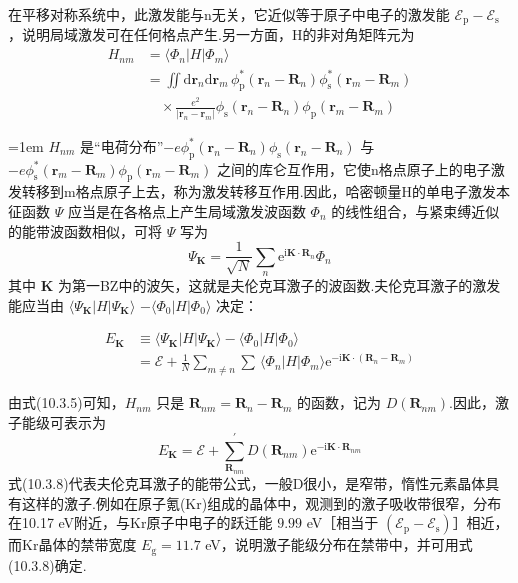 在平移对称系统中，此激发能与n无关，它近似等于原子中电子的激发能 $\mathscr{E}_{\mathrm{p}}-\mathscr{E}_{\mathrm{s}}$，说明局域激发可在任何格点产生.另一方面，H的非对角矩阵元为
\begin{equation}
\begin{aligned}
  H_{nm}&=\langle\varPhi_{n}|H|\varPhi_{m}\rangle\\
  &=\iint\mathrm{d}\boldsymbol{r}_{n}\mathrm{d}\boldsymbol{r}_{m}\,
  \phi_{\mathrm{p}}^{*}(\boldsymbol{r}_{n}-\boldsymbol{R}_{n})
  \phi_{\mathrm{s}}^{*}(\boldsymbol{r}_{m}-\boldsymbol{R}_{m})\\
  &\quad\times\frac{e^{2}}{|\boldsymbol{r}_{n}-\boldsymbol{r}_{m}|}
  \phi_{\mathrm{s}}(\boldsymbol{r}_{n}-\boldsymbol{R}_{n})
  \phi_{\mathrm{p}}(\boldsymbol{r}_{m}-\boldsymbol{R}_{m})
\end{aligned}
\end{equation}
{\emergencystretch=1em\relax
$H_{nm}$ 是“电荷分布”$-e\phi_{\mathrm{p}}^{*}(\boldsymbol{r}_{n}-\boldsymbol{R}_{n})\phi_{\mathrm{s}}(\boldsymbol{r}_{n}-\boldsymbol{R}_{n})$ 与 $-e\phi_{\mathrm{s}}^{*}(\boldsymbol{r}_{m}-\boldsymbol{R}_{m})\phi_{\mathrm{p}}(\boldsymbol{r}_{m}-\boldsymbol{R}_{m})$ 之间的库仑互作用，它使n格点原子上的电子激发转移到m格点原子上去，称为激发转移互作用.因此，哈密顿量H的单电子激发本征函数 $\varPsi$ 应当是在各格点上产生局域激发波函数 $\varPhi_{n}$ 的线性组合，与紧束缚近似的能带波函数相似，可将 $\varPsi$ 写为
\begin{equation}
  \varPsi_{\boldsymbol{K}}=\frac{1}{\sqrt{N}}\sum_{n}
  \mathrm{e}^{\mathrm{i}\boldsymbol{K}\cdot\boldsymbol{R}_{n}}\varPhi_{n}
\end{equation}
其中 $\boldsymbol{K}$ 为第一BZ中的波矢，这就是夫伦克耳激子的波函数.夫伦克耳激子的激发能应当由 $\langle\varPsi_{\boldsymbol{K}}|H|\varPsi_{\boldsymbol{K}}\rangle$ $-\langle\varPhi_{0}|H|\varPhi_{0}\rangle$ 决定：\par}
\begin{equation}
\begin{aligned}
  E_{\boldsymbol{K}}&\equiv\langle\varPsi_{\boldsymbol{K}}|H|\varPsi_{\boldsymbol{K}}\rangle
  -\langle\varPhi_{0}|H|\varPhi_{0}\rangle\\
  &=\mathscr{E}+\frac{1}{N}\sum_{m\neq n}\sum\,
  \langle\varPhi_{n}|H|\varPhi_{m}\rangle
  \mathrm{e}^{-\mathrm{i}\boldsymbol{K}\cdot(\boldsymbol{R}_{n}-\boldsymbol{R}_{m})}
\end{aligned}
\end{equation}

由式(10.3.5)可知，$H_{nm}$ 只是 $\boldsymbol{R}_{nm}=\boldsymbol{R}_{n}-\boldsymbol{R}_{m}$ 的函数，记为 $D(\boldsymbol{R}_{nm})$.因此，激子能级可表示为
\begin{equation}
  E_{\boldsymbol{K}}=\mathscr{E}
  +\sum_{\boldsymbol{R}_{nm}}^{\prime}D(\boldsymbol{R}_{nm})
  \mathrm{e}^{-\mathrm{i}\boldsymbol{K}\cdot\boldsymbol{R}_{nm}}
\end{equation}
式(10.3.8)代表夫伦克耳激子的能带公式，一般D很小，是窄带，惰性元素晶体具有这样的激子.例如在原子氪(Kr)组成的晶体中，观测到的激子吸收带很窄，分布在10.17 eV附近，与Kr原子中电子的跃迁能 $9.99$ eV［相当于 $(\mathscr{E}_{\mathrm{p}}-\mathscr{E}_{\mathrm{s}})$］相近，而Kr晶体的禁带宽度 $E_{\mathrm{g}}=11.7$ eV，说明激子能级分布在禁带中，并可用式(10.3.8)确定.

